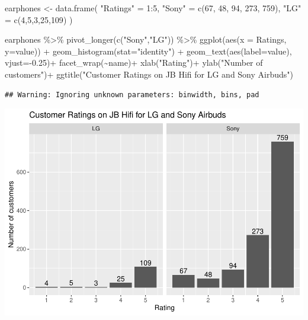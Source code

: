 \documentclass[
]{article}
\newenvironment{Shaded}{\begin{snugshade}}{\end{snugshade}}
\newcommand{\AttributeTok}[1]{\textcolor[rgb]{0.80,0.80,0.80}{#1}}
\newcommand{\DecValTok}[1]{\textcolor[rgb]{0.86,0.86,0.80}{#1}}
\newcommand{\FloatTok}[1]{\textcolor[rgb]{0.75,0.75,0.82}{#1}}
\newcommand{\FunctionTok}[1]{\textcolor[rgb]{0.94,0.94,0.56}{#1}}
\newcommand{\NormalTok}[1]{\textcolor[rgb]{0.80,0.80,0.80}{#1}}
\newcommand{\OtherTok}[1]{\textcolor[rgb]{0.94,0.94,0.56}{#1}}
\newcommand{\SpecialCharTok}[1]{\textcolor[rgb]{0.86,0.64,0.64}{#1}}
\newcommand{\StringTok}[1]{\textcolor[rgb]{0.80,0.58,0.58}{#1}}
\begin{document}
\begin{Shaded}
\begin{Highlighting}[]
\NormalTok{earphones }\OtherTok{\textless{}{-}} \FunctionTok{data.frame}\NormalTok{(}
  \StringTok{"Ratings"} \OtherTok{=} \DecValTok{1}\SpecialCharTok{:}\DecValTok{5}\NormalTok{,}
  \StringTok{"Sony"} \OtherTok{=} \FunctionTok{c}\NormalTok{(}\DecValTok{67}\NormalTok{, }\DecValTok{48}\NormalTok{, }\DecValTok{94}\NormalTok{, }\DecValTok{273}\NormalTok{, }\DecValTok{759}\NormalTok{),}
  \StringTok{"LG"} \OtherTok{=} \FunctionTok{c}\NormalTok{(}\DecValTok{4}\NormalTok{,}\DecValTok{5}\NormalTok{,}\DecValTok{3}\NormalTok{,}\DecValTok{25}\NormalTok{,}\DecValTok{109}\NormalTok{)}
\NormalTok{)}

\NormalTok{earphones }\SpecialCharTok{\%\textgreater{}\%}
  \FunctionTok{pivot\_longer}\NormalTok{(}\FunctionTok{c}\NormalTok{(}\StringTok{"Sony"}\NormalTok{,}\StringTok{"LG"}\NormalTok{)) }\SpecialCharTok{\%\textgreater{}\%}
  \FunctionTok{ggplot}\NormalTok{(}\FunctionTok{aes}\NormalTok{(}\AttributeTok{x =}\NormalTok{ Ratings, }\AttributeTok{y=}\NormalTok{value)) }\SpecialCharTok{+}
  \FunctionTok{geom\_histogram}\NormalTok{(}\AttributeTok{stat=}\StringTok{"identity"}\NormalTok{) }\SpecialCharTok{+}
  \FunctionTok{geom\_text}\NormalTok{(}\FunctionTok{aes}\NormalTok{(}\AttributeTok{label=}\NormalTok{value), }\AttributeTok{vjust=}\SpecialCharTok{{-}}\FloatTok{0.25}\NormalTok{)}\SpecialCharTok{+}
  \FunctionTok{facet\_wrap}\NormalTok{(}\SpecialCharTok{\textasciitilde{}}\NormalTok{name)}\SpecialCharTok{+}
  \FunctionTok{xlab}\NormalTok{(}\StringTok{"Rating"}\NormalTok{)}\SpecialCharTok{+}
  \FunctionTok{ylab}\NormalTok{(}\StringTok{"Number of customers"}\NormalTok{)}\SpecialCharTok{+}
  \FunctionTok{ggtitle}\NormalTok{(}\StringTok{"Customer Ratings on JB Hifi for LG and Sony Airbuds"}\NormalTok{)}
\end{Highlighting}
\end{Shaded}

\begin{verbatim}
## Warning: Ignoring unknown parameters: binwidth, bins, pad
\end{verbatim}

\includegraphics{notes_files/figure-latex/unnamed-chunk-6-1.pdf}
\end{document}
